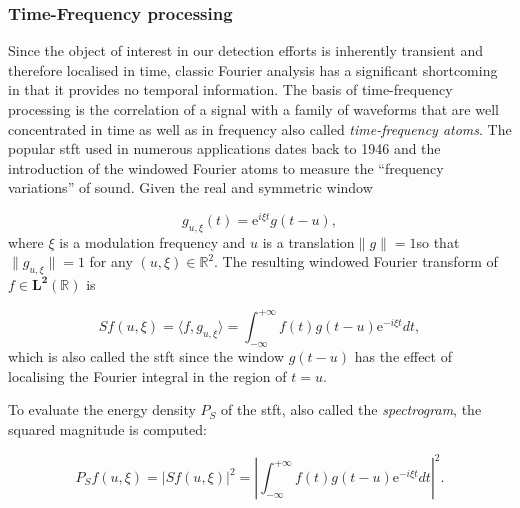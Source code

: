 \subsubsection{Time-Frequency processing}
Since the object of interest in our detection efforts is inherently transient and therefore localised in time, classic Fourier analysis has a significant shortcoming in that it provides no temporal information. The basis of time-frequency processing is the correlation of a signal with a family of waveforms that are well concentrated in time as well as in frequency \cite{Mallat1999} also called \emph{time-frequency atoms}\cite{Gabor1946}. The popular \DIFdelbegin {}\DIFdelend \DIFaddbegin \gls{stft} \DIFaddend used in numerous applications dates back to 1946 and the introduction of the windowed Fourier atoms to measure the ``frequency variations'' of sound. Given the real and symmetric window

\begin{equation}\label{eq:Mallat1999}
g_{u,\xi}(t) = \mathrm{e}^{i\xi t}g(t-u),
\end{equation}
where $\xi$ is a modulation frequency and $u$ is a translation\DIFdelbegin {}\DIFdelend \DIFaddbegin {}\DIFaddend $\|g\| = 1$\DIFaddbegin \DIFadd{, }\DIFaddend so that $\|g_{u,\xi}\| = 1$ for any $(u, \xi) \in \mathbb{R}^2$. The resulting windowed Fourier transform of $f \in \mathbf{L^2}(\mathbb{R})$ is

\begin{equation}\label{eq:Mallat1999_2}
S f(u, \xi) = \langle f, g_{u,\xi} \rangle = \int^{+\infty}_{-\infty}  f(t)g(t-u)\mathrm{e}^{-i\xi t} dt,
\end{equation}
which is also called the \DIFdelbegin {}\DIFdelend \DIFaddbegin \gls{stft} \DIFaddend since the window $g(t-u)$ has the effect of localising the Fourier integral in the region of $t=u$. \DIFaddbegin {}\DIFaddend 

To evaluate the energy density $P_S$ of the \DIFdelbegin {}\DIFdelend \DIFaddbegin \gls{stft}\DIFaddend , also called the \emph{spectrogram}, the squared magnitude is computed:

\begin{equation}\label{eq:Mallat1999_3}
P_S f(u,\xi) = |S f(u,\xi)|^2 = \left| \int^{+\infty}_{-\infty} f(t)g(t-u)\mathrm{e}^{-i\xi t} dt \right|^2.
\end{equation}

